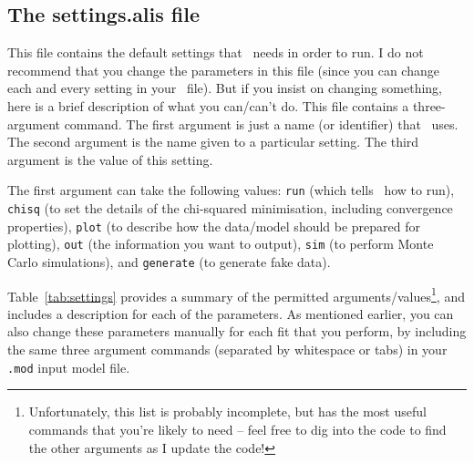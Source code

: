 \subsection{The settings.alis file}\label{sec:settings}

This file contains the default settings that \alis\ needs in order to
run. I do not recommend that you change the parameters in this
file (since you can change each and every setting in your
\dmod\ file). But if you insist on changing something,
here is a brief description of what you can/can't do. This
file contains a three-argument command. The first argument
is just a name (or identifier) that \alis\ uses. The second
argument is the name given to a particular setting. The
third argument is the value of this setting.

The first argument can take the following values:
\texttt{run} (which tells \alis\ how to run), 
\texttt{chisq} (to set the details of the chi-squared minimisation, including convergence properties), 
\texttt{plot} (to describe how the data/model should be prepared for plotting), 
\texttt{out} (the information you want to output), 
\texttt{sim} (to perform Monte Carlo simulations), 
and
\texttt{generate} (to generate fake data).

Table~\ref{tab:settings} provides a summary of the
permitted arguments/values\footnote{Unfortunately, this list is probably incomplete, but has the most useful commands that you're likely to need -- feel free to dig into the code to find the other arguments as I update the code!}, and includes a description
for each of the parameters. As mentioned earlier, you
can also change these parameters manually for each
fit that you perform, by including the same three argument
commands (separated by whitespace or tabs) in your
\texttt{.mod} input model file.

